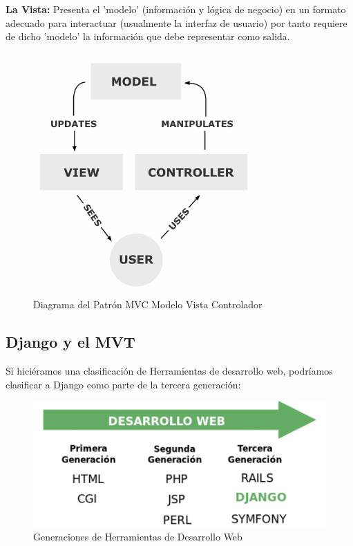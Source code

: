 {\bfseries La Vista:} Presenta el 'modelo' (información y lógica de negocio)  en un formato adecuado para interactuar (usualmente la interfaz de usuario)  por tanto requiere de dicho 'modelo' la información que debe representar como  salida.

\begin{figure}[h]
    \centering
    \includegraphics[scale=0.7]{resourse/MVC-Process.png}
    \caption{Diagrama del Patrón MVC Modelo Vista Controlador}
    \label{fig:03}
\end{figure}    


\subsection{Django y el MVT}

Si hiciéramos una clasificación de Herramientas de desarrollo web, podríamos clasificar a Django como parte de la tercera generación:


\begin{figure}[h]
    \centering
    \includegraphics[scale=0.7]{resourse/desarrolloweb.png}
    \caption{Generaciones de Herramientas de Desarrollo Web}
    \label{fig:02}
\end{figure}   

